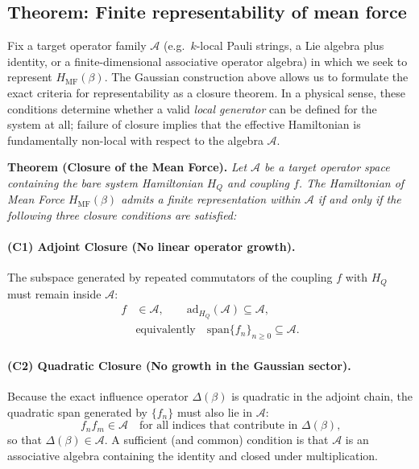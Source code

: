 \subsection{Theorem: Finite representability of mean force}

Fix a target operator family $\mathcal A$ (e.g.\ $k$-local Pauli strings, a Lie algebra plus identity,
or a finite-dimensional associative operator algebra) in which we seek to represent $H_{\mathrm{MF}}(\beta)$.
The Gaussian construction above allows us to formulate the exact criteria for representability as a closure theorem.
In a physical sense, these conditions determine whether a valid \emph{local generator} can be defined for the system at all;
failure of closure implies that the effective Hamiltonian is fundamentally non-local with respect to the algebra $\mathcal A$.

\vspace{0.5em}
\noindent\textbf{Theorem (Closure of the Mean Force).}
\textit{Let $\mathcal A$ be a target operator space containing the bare system Hamiltonian $H_Q$ and coupling $f$. The Hamiltonian of Mean Force $H_{\mathrm{MF}}(\beta)$ admits a finite representation within $\mathcal A$ if and only if the following three closure conditions are satisfied:}

\paragraph{(C1) Adjoint Closure (No linear operator growth).}
The subspace generated by repeated commutators of the coupling $f$ with $H_Q$ must remain inside $\mathcal A$:
\begin{equation}
    \begin{split}
        f & \in\mathcal A,\qquad \mathrm{ad}_{H_Q}(\mathcal A)\subseteq \mathcal A,     \\
          & \text{equivalently}\quad \mathrm{span}\{f_n\}_{n\ge 0}\subseteq \mathcal A.
    \end{split}
    \label{eq:C1_adjoint_closure}
\end{equation}

\paragraph{(C2) Quadratic Closure (No growth in the Gaussian sector).}
Because the exact influence operator $\Delta(\beta)$ is quadratic in the adjoint chain,
the quadratic span generated by $\{f_n\}$ must also lie in $\mathcal A$:
\begin{equation}
    f_n f_m \in \mathcal A\quad \text{for all indices that contribute in $\Delta(\beta)$,}
    \label{eq:C2_product_closure}
\end{equation}
so that $\Delta(\beta)\in\mathcal A$. A sufficient (and common) condition is that $\mathcal A$ is an
associative algebra containing the identity and closed under multiplication.

